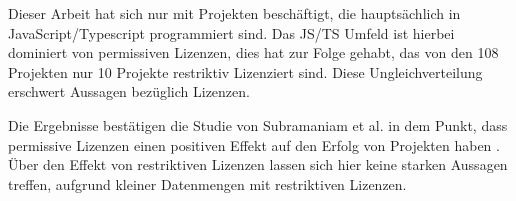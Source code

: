 
\bigskip
\noindent
Dieser Arbeit hat sich nur mit Projekten beschäftigt, die hauptsächlich in JavaScript/Typescript
programmiert sind. Das JS/TS Umfeld ist hierbei dominiert von permissiven Lizenzen, dies hat zur
Folge gehabt, das von den 108 Projekten nur 10 Projekte restriktiv Lizenziert sind. Diese
Ungleichverteilung erschwert Aussagen bezüglich Lizenzen.


\bigskip
\noindent
Die Ergebnisse bestätigen die Studie von Subramaniam et al. in dem Punkt, dass permissive Lizenzen 
einen positiven Effekt auf den Erfolg von Projekten haben \cite{subramaniamDeterminantsOpenSource2009}. 
Über den Effekt von restriktiven Lizenzen lassen sich hier keine starken Aussagen treffen, aufgrund 
kleiner Datenmengen mit restriktiven Lizenzen.










